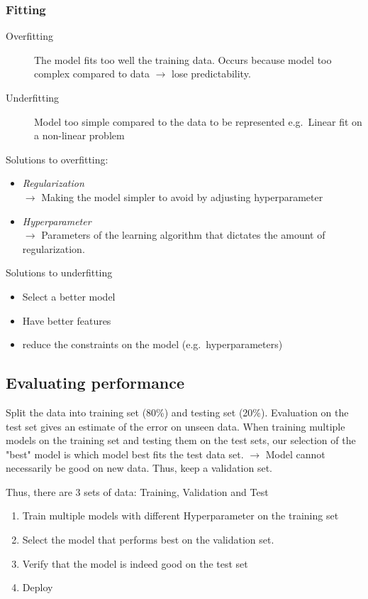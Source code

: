 \subsubsection{Fitting}
\begin{description}
  \item[Overfitting] The model fits too well the training data. Occurs because model too complex compared to data $\rightarrow$ lose predictability.
  \item[Underfitting] Model too simple compared to the data to be represented e.g.\ Linear fit on a non-linear problem
\end{description}

Solutions to overfitting:
\begin{itemize}
  \item \textit{Regularization}\\
    $\rightarrow$ Making the model simpler to avoid by adjusting hyperparameter
  \item \textit{Hyperparameter}\\
    $\rightarrow$ Parameters of the learning algorithm that dictates the amount of regularization.
\end{itemize}

Solutions to underfitting
\begin{itemize}
  \item Select a better model
  \item Have better features
  \item reduce the constraints on the model (e.g.\ hyperparameters)
\end{itemize}

\subsection{Evaluating performance}

Split the data into training set (80\%) and testing set (20\%).
Evaluation on the test set gives an estimate of the error on unseen data.
When training multiple models on the training set and testing them on the test sets, our selection of the "best" model is which model best fits the test data set.
$\rightarrow$ Model cannot necessarily be good on new data.
Thus, keep a validation set.

Thus, there are 3 sets of data: Training, Validation and Test
\begin{enumerate}
  \item Train multiple models with different Hyperparameter on the training set
  \item Select the model that performs best on the validation set.
  \item Verify that the model is indeed good on the test set
  \item Deploy
\end{enumerate}

